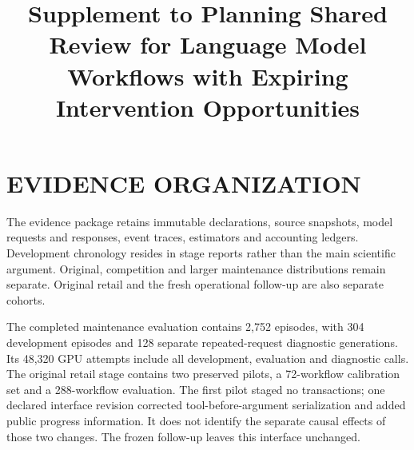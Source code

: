 

\title{Supplement to Planning Shared Review for Language Model Workflows with Expiring Intervention Opportunities}
\author{}
\onecolumn\maketitle\normalsize\setcounter{footnote}{0}\vfill



\section{EVIDENCE ORGANIZATION}
\noindent The evidence package retains immutable declarations, source snapshots, model requests and responses, event traces, estimators and accounting ledgers. Development chronology resides in stage reports rather than the main scientific argument. Original, competition and larger maintenance distributions remain separate. Original retail and the fresh operational follow-up are also separate cohorts.\draftcredit

The completed maintenance evaluation contains 2,752 episodes, with 304 development episodes and 128 separate repeated-request diagnostic generations. Its 48,320 GPU attempts include all development, evaluation and diagnostic calls. The original retail stage contains two preserved pilots, a 72-workflow calibration set and a 288-workflow evaluation. The first pilot staged no transactions; one declared interface revision corrected tool-before-argument serialization and added public progress information. It does not identify the separate causal effects of those two changes. The frozen follow-up leaves this interface unchanged.

